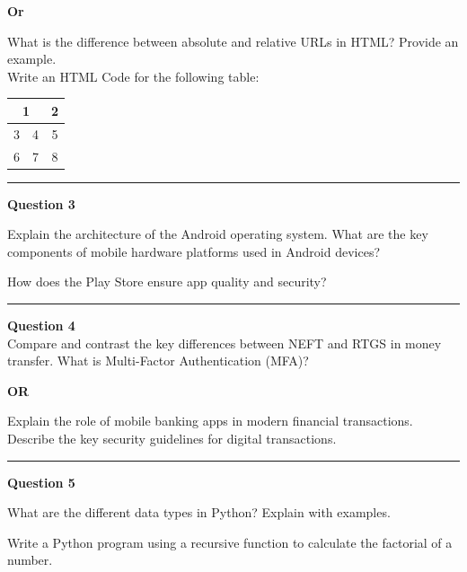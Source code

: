 \documentclass[11pt,a4paper]{article}
\begin{document}
\begin{center}   \textbf{Or}\end{center}

What is the difference between absolute and relative URLs in HTML? Provide an example.\\[6pt]
Write an HTML Code for the following table:

\begin{center}
\begin{tabular}{|c|c|c|c|}
\hline
\multicolumn{3}{|c|}{1} & 2 \\ \hline
\multicolumn{2}{|c|}{3} & 4 & 5 \\ \hline
6 & \multicolumn{2}{|c|}{7} & 8 \\ \hline
\end{tabular}
\end{center}

\medskip\rule{\linewidth}{0.2pt}\medskip




\noindent   \textbf{Question 3}

\begin{parts}
  \item Explain the architecture of the Android operating system. What are the key components of mobile hardware platforms used in Android devices?
  \item How does the Play Store ensure app quality and security?
\end{parts}

\medskip\rule{\linewidth}{0.2pt}\medskip




\noindent   \textbf{Question 4} \\
Compare and contrast the key differences between NEFT and RTGS in money transfer. What is Multi-Factor Authentication (MFA)?


\begin{center}   \textbf{OR}\end{center}

Explain the role of mobile banking apps in modern financial transactions. Describe the key security guidelines for digital transactions.

\medskip\rule{\linewidth}{0.2pt}\medskip




\noindent   \textbf{Question 5}

\begin{parts}
  \item What are the different data types in Python? Explain with examples.
  \item Write a Python program using a recursive function to calculate the factorial of a number.
\end{parts}
\end{document}
